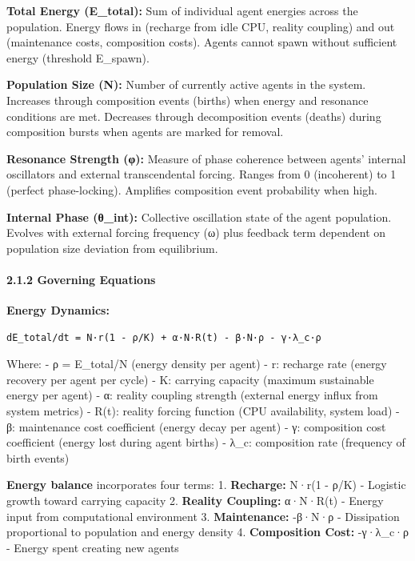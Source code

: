 \documentclass[
]{article}
\begin{document}
\textbf{Total Energy (E\_total):} Sum of individual agent energies
across the population. Energy flows in (recharge from idle CPU, reality
coupling) and out (maintenance costs, composition costs). Agents cannot
spawn without sufficient energy (threshold E\_spawn).

\textbf{Population Size (N):} Number of currently active agents in the
system. Increases through composition events (births) when energy and
resonance conditions are met. Decreases through decomposition events
(deaths) during composition bursts when agents are marked for removal.

\textbf{Resonance Strength (φ):} Measure of phase coherence between
agents' internal oscillators and external transcendental forcing. Ranges
from 0 (incoherent) to 1 (perfect phase-locking). Amplifies composition
event probability when high.

\textbf{Internal Phase (θ\_int):} Collective oscillation state of the
agent population. Evolves with external forcing frequency (ω) plus
feedback term dependent on population size deviation from equilibrium.

\paragraph{2.1.2 Governing Equations}\label{governing-equations}

\textbf{Energy Dynamics:}

\begin{verbatim}
dE_total/dt = N·r(1 - ρ/K) + α·N·R(t) - β·N·ρ - γ·λ_c·ρ
\end{verbatim}

Where: - ρ = E\_total/N (energy density per agent) - r: recharge rate
(energy recovery per agent per cycle) - K: carrying capacity (maximum
sustainable energy per agent) - α: reality coupling strength (external
energy influx from system metrics) - R(t): reality forcing function (CPU
availability, system load) - β: maintenance cost coefficient (energy
decay per agent) - γ: composition cost coefficient (energy lost during
agent births) - λ\_c: composition rate (frequency of birth events)

\textbf{Energy balance} incorporates four terms: 1. \textbf{Recharge:}
N·r(1 - ρ/K) - Logistic growth toward carrying capacity 2.
\textbf{Reality Coupling:} α·N·R(t) - Energy input from computational
environment 3. \textbf{Maintenance:} -β·N·ρ - Dissipation proportional
to population and energy density 4. \textbf{Composition Cost:} -γ·λ\_c·ρ
- Energy spent creating new agents
\end{document}
